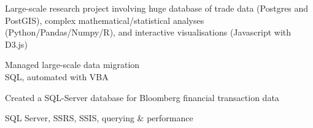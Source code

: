 \documentclass[a4paper,nomath]{deedy-resume} %
\begin{document}
\begin{paracol}{2}
    \sectionspace %
    

    \begin{tightitemize}
        \item Large-scale research project involving huge database of trade data (Postgres and PostGIS),
        complex mathematical/statistical analyses (Python/Pandas/Numpy/R), and interactive visualisations (Javascript with D3.js)
    \end{tightitemize}

    \sectionspace %



    \begin{tightitemize}
        \item Managed large-scale data migration \\
        SQL, automated with VBA
        \item Created a SQL-Server database for Bloomberg financial transaction data
    \end{tightitemize}

    \sectionspace %



    \begin{tightitemize}
        \item SQL Server, SSRS, SSIS, querying \& performance
    \end{tightitemize}

    \sectionspace %
    



\end{paracol}
\end{document}

